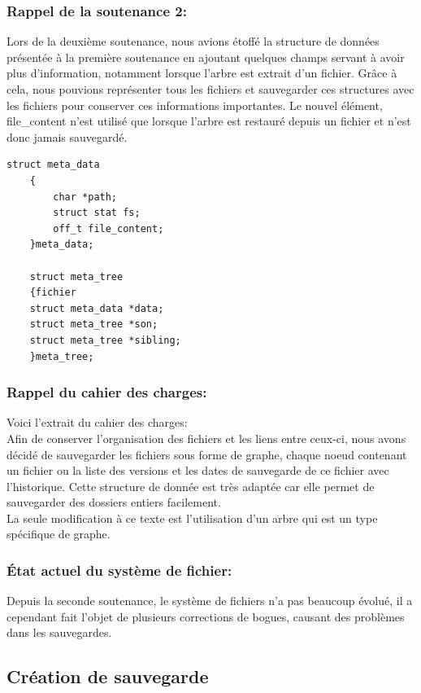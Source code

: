         \subsubsection{Rappel de la soutenance 2:}
        Lors de la deuxième soutenance, nous avions étoffé la structure de données présentée à la première soutenance en ajoutant quelques champs servant à avoir plus d'information, notamment lorsque l'arbre est extrait d'un fichier. Grâce à cela, nous pouvions représenter tous les fichiers et sauvegarder ces structures avec les fichiers pour conserver ces informations importantes. Le nouvel élément, file\_content n'est utilisé que lorsque l'arbre est restauré depuis un fichier et n'est donc jamais sauvegardé. 
        \newpage
        \begin{lstlisting}[style=CStyle]
    struct meta_data
    {
        char *path;
        struct stat fs;
        off_t file_content;
    }meta_data;
    
    struct meta_tree
    {fichier
    struct meta_data *data;
    struct meta_tree *son;
    struct meta_tree *sibling;
    }meta_tree;
		\end{lstlisting}
        \subsubsection{Rappel du cahier des charges:}
        Voici l'extrait du cahier des charges:\\
        Afin de conserver l'organisation des fichiers et les liens entre ceux-ci, nous avons décidé de sauvegarder les fichiers sous forme de graphe, chaque noeud contenant un fichier ou la liste des versions et les dates de sauvegarde de ce fichier avec l'historique. Cette structure de donnée est très adaptée car elle permet de sauvegarder des dossiers entiers facilement.\\
        La seule modification à ce texte est l'utilisation d'un arbre qui est un type spécifique de graphe.
        \subsubsection{État actuel du système de fichier:}
        Depuis la seconde soutenance, le système de fichiers n'a pas beaucoup évolué, il a cependant fait l'objet de plusieurs corrections de bogues, causant des problèmes dans les sauvegardes.
        \newpage
    \subsection{Création de sauvegarde}
